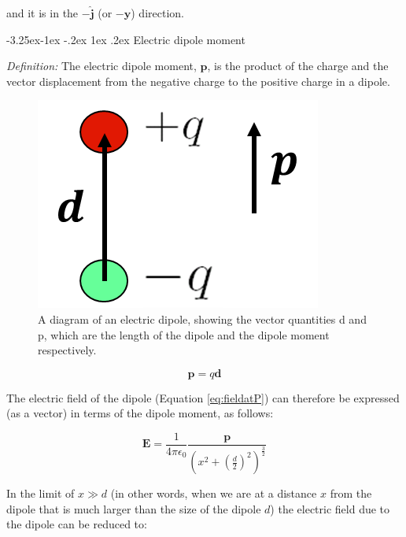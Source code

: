 \documentclass[
]{book}
\makeatletter
\renewcommand\subsection{%
\@startsection{subsection}{2}{\z@}%
              {-3.25ex\@plus -1ex \@minus -.2ex}%
              {1ex \@plus .2ex}%
              {\sffamily\bfseries}}
\makeatother
\begin{document}
and it is in the \(-\hat{\mathbf{j}}\) (or \(-\hat{\mathbf{y}}\)) direction.

\hypertarget{electric-dipole-moment}{%
\subsection{Electric dipole moment}\label{electric-dipole-moment}}

\emph{Definition:} The electric dipole moment, \(\mathbf{p}\), is the product of the
charge and the vector displacement from the negative charge to the
positive charge in a dipole.

\begin{figure}

{\centering \includegraphics[width=0.7\linewidth]{Figures/dipole_moment} 

}

\caption{A diagram of an electric dipole, showing the vector quantities d and p, which are the length of the dipole and the dipole moment respectively.}\label{fig:dipoleMoment}
\end{figure}

\begin{equation}
\label{eq:dipoleMoment}
\mathbf{p} = q \mathbf{d}
\end{equation}

The electric field of the dipole (Equation
\eqref{eq:fieldatP}) can therefore be expressed (as a vector) in
terms of the dipole moment, as follows:

\begin{equation}
\label{eq:fieldatPdipole}
\mathbf{E} = \frac{1}{4 \pi \epsilon_0} \frac{\mathbf{p}}{\left( x^2 + \left( \frac{d}{2} \right)^2 \right)^{\frac{3}{2}}}
\end{equation}

In the limit of \(x \gg d\) (in other words, when we are at a distance \(x\)
from the dipole that is much larger than the size of the dipole \(d\)) the
electric field due to the dipole can be reduced to:
\end{document}
